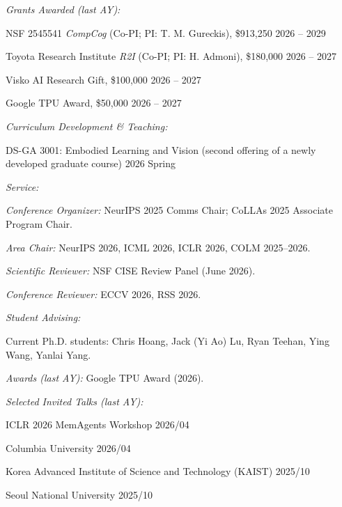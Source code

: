 {\it Grants Awarded (last AY):}
\begin{list2}
\item NSF 2545541 \emph{CompCog} (Co-PI; PI: T. M. Gureckis), \$913,250 \hfill 2026 -- 2029
\item Toyota Research Institute \emph{R2I} (Co-PI; PI: H. Admoni), \$180,000 \hfill 2026 -- 2027
\item Visko AI Research Gift, \$100,000 \hfill 2026 -- 2027
\item Google TPU Award, \$50,000 \hfill 2026 -- 2027
\end{list2}

{\it Curriculum Development \& Teaching:}
\begin{list2}
\item DS-GA 3001: Embodied Learning and Vision (second offering of a newly developed graduate course) \hfill 2026 Spring
\end{list2}

{\it Service:}
\begin{list2}
\item \textit{Conference Organizer:} NeurIPS 2025 Comms Chair; CoLLAs 2025 Associate Program Chair.
\item \textit{Area Chair:} NeurIPS 2026, ICML 2026, ICLR 2026, COLM 2025--2026.
\item \textit{Scientific Reviewer:} NSF CISE Review Panel (June 2026).
\item \textit{Conference Reviewer:} ECCV 2026, RSS 2026.
\end{list2}

{\it Student Advising:}
\begin{list2}
\item Current Ph.D. students: Chris Hoang, Jack (Yi Ao) Lu, Ryan Teehan, Ying Wang, Yanlai Yang.
\end{list2}

{\it Awards (last AY):} Google TPU Award (2026).

{\it Selected Invited Talks (last AY):}
\begin{list2}
\item ICLR 2026 MemAgents Workshop \hfill 2026/04
\item Columbia University \hfill 2026/04
\item Korea Advanced Institute of Science and Technology (KAIST) \hfill 2025/10
\item Seoul National University \hfill 2025/10
\end{list2}

\vspace{0.1in}
